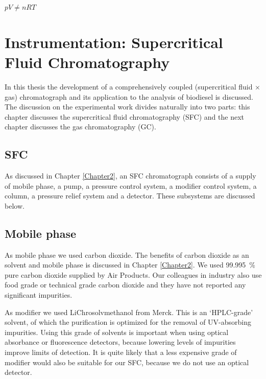 
\begin{savequote}[\quotewidth]
$pV \neq nRT$ 
\end{savequote}

\chapter{Instrumentation: Supercritical Fluid Chromatography} %

\label{Chapter4} %

In this thesis the development of a comprehensively coupled (supercritical fluid
× gas) chromatograph and its application to the analysis of biodiesel is
discussed. The discussion on the experimental work divides naturally into two
parts: this chapter discusses the supercritical fluid chromatography (SFC) and
the next chapter discusses the gas chromatography (GC).

\section{SFC}

As discussed in Chapter \ref{Chapter2}, an SFC chromatograph consists of a
supply of mobile phase, a pump, a pressure control system, a modifier control
system, a column, a pressure relief system and a detector. These subsystems are
discussed below.

\section{Mobile phase}

As mobile phase we used carbon dioxide. The benefits of carbon dioxide as an
solvent and mobile phase is discussed in Chapter \ref{Chapter2}. We used
\SI{99.995}{\percent} pure carbon dioxide supplied by Air Products. Our
colleagues in industry also use food grade or technical grade carbon dioxide and
they have not reported any significant impurities.

As modifier we used LiChrosolv\textregistered methanol from Merck. This is an
`HPLC-grade' solvent, of which the purification is optimized for the removal of
UV-absorbing impurities. Using this grade of solvents is important when using
optical absorbance or fluorescence detectors, because lowering levels of
impurities improve limits of detection. It is quite likely that a less expensive
grade of modifier would also be suitable for our SFC, because we do not use an
optical detector.

